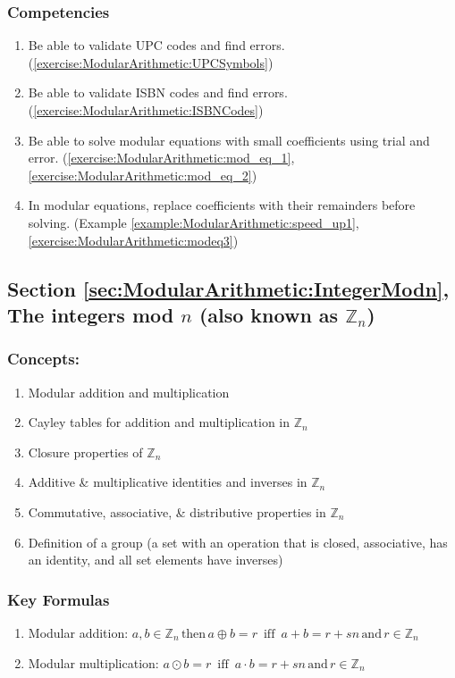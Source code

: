 \subsubsection*{Competencies}
\begin{enumerate}
\item
Be able to validate UPC codes and find errors. (\ref{exercise:ModularArithmetic:UPCSymbols}) 
\item
Be able to validate ISBN codes and find errors. (\ref{exercise:ModularArithmetic:ISBNCodes}) 
\item
Be able to solve modular equations with small coefficients using trial and error. (\ref{exercise:ModularArithmetic:mod_eq_1}, \ref{exercise:ModularArithmetic:mod_eq_2})
\item
In modular equations, replace coefficients with their remainders before solving. (Example \ref{example:ModularArithmetic:speed_up1}, \ref{exercise:ModularArithmetic:modeq3})
\end{enumerate}


\subsection*{Section \ref{sec:ModularArithmetic:IntegerModn}, The integers mod $n$ (also known as ${\mathbb Z}_{n}$)}
\subsubsection*{Concepts:}
\begin{enumerate}
\item 
Modular addition and multiplication
\item
Cayley tables for addition and multiplication in ${\mathbb Z}_{n}$
\item
Closure properties of ${\mathbb Z}_{n}$
\item
Additive \& multiplicative identities and inverses in ${\mathbb Z}_{n}$
\item
Commutative, associative, \& distributive properties in ${\mathbb Z}_{n}$
\item
Definition of a group (a set with an operation that is closed, associative, has an identity, and all set elements have inverses)
\end{enumerate}

\subsubsection*{Key Formulas}
\begin{enumerate}
\item
Modular addition: $a, b \in {\mathbb Z}_{n}\, \text{then}\, a \oplus b = r\,\mbox{ iff }\, a + b = r + sn \, \text{and} \, r \in {\mathbb Z}_{n}$
\item
Modular multiplication: $a \odot b = r \, \mbox{ iff } \, a \cdot b = r + sn \, \text{and} \, r \in {\mathbb Z}_{n}$

\end{enumerate}

